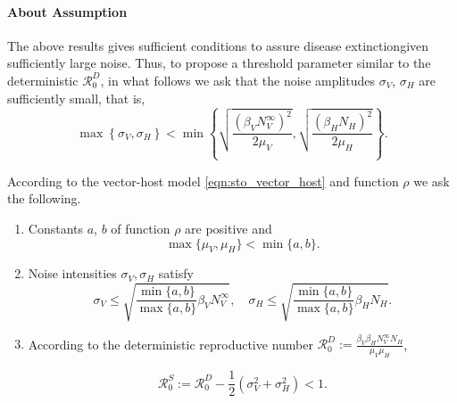 \paragraph{About Assumption}
The above results gives sufficient conditions to assure 
disease extinction\textemdash given sufficiently large noise. Thus, 
to propose a threshold parameter similar  to the deterministic
$\mathcal{R}_0^D$, in what follows we ask that the noise amplitudes 
$\sigma_V$, $\sigma_H$ are sufficiently small, that is,
\begin{equation}\label{eqn:noise_small_condition}
    \displaystyle
    \max
        \left \{
              \sigma_V, \sigma_H 
        \right\} 
        < 
    \min 
        \left \{
            \sqrt{\frac{(\beta_V N_V ^ {\infty}) ^ 2}{2 \mu_V}},
            \sqrt{\frac{(\beta_H N_H) ^ 2}{2 \mu_H}}
        \right \}.
\end{equation}
%
%
%
\begin{assumption}\label{ass:extinction}
    According to the vector-host model \eqref{eqn:sto_vector_host} and 
    function
    $\rho$
    we ask the following.
    \begin{enumerate}[\bf{(E\textendash}1)]
        \item 
            Constants $a$, $b$ of function $\rho$ are positive and
            $$
                \max \{\mu_V, \mu_H \} < \min \{a, b \}.
            $$
        \item \label{ass:noise_condition}
            Noise intensities $\sigma_V, \sigma_H$ satisfy
            $$
                \sigma_V \leq 
                    \sqrt{
                        \frac{
                            \min\{a, b\}
                        }{
                            \max \{a, b \}
                        }
                    \beta_V  N_V^{\infty}
                    },
                 \quad
                \sigma_H \leq
                    \sqrt{
                        \frac{
                            \min\{a, b\}
                        }{
                            \max \{a, b \}
                        } 
                        \beta_H N_H 
                    } .
            $$
        \item
            According to the deterministic reproductive
            number 
            $   \displaystyle
                \mathcal{R}_0 ^ D :=
                    \frac{
                         \beta_V \beta_H 
                         N_V ^ \infty N_H
                    }{
                        \mu_V \mu_H
                    }
            $,

            $$
            \mathcal{R}_0 ^ S :=
                \mathcal{R}_0^D - 
                \frac{1}{2}
                \left( 
                    \sigma_V ^ 2
                    +
                    \sigma_H ^ 2
                \right)
                <1 .
            $$
    \end{enumerate}
\end{assumption}
